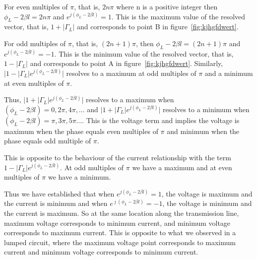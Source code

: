 For even multiples of $\pi$, that is, $2n\pi$ where n is a positive integer then $\phi_L - 2\beta l = 2n\pi$ and $ e^{j(\phi_L - 2 \beta l)} = 1$. This is the maximum value of the resolved vector, that is, $1 + \lvert\Gamma_L\rvert$ and corresponds to point B in figure~\ref{fig:kjhgfdwert}.

For odd multiples of $\pi$, that is, $(2n + 1)\pi$, then $\phi_L - 2 \beta l=(2 n + 1)\pi$ and $e^{j (\phi_L - 2 \beta l)} = -1$. This is the minimum value of the resolved vector, that is, $1 - \lvert\Gamma_L\rvert$ and corresponds to point A in figure~\ref{fig:kjhgfdwert}. Similarly, $\lvert 1 - \lvert\Gamma_L\rvert e^{j (\phi_L - 2\beta l)}\rvert$ resolves to a maximum at odd multiples of $\pi$ and a minimum at even multiples of $\pi$.

Thus, $\lvert 1 + \lvert\Gamma_L\rvert e^{j (\phi_L - 2\beta l)}\rvert$ resolves to a maximum when $(\phi_L - 2\beta l) = 0, 2\pi, 4\pi, \ldots$ and $\lvert 1 + \lvert\Gamma_L\rvert e^{j (\phi_L - 2\beta l)}\rvert$ resolves to a minimum when $(\phi_L -2\beta l) = \pi, 3\pi, 5\pi \ldots$. This is the voltage term and implies the voltage is maximum when the phase equals even multiples of $\pi$ and minimum when the phase equals odd multiple of $\pi$.

This is opposite to the behaviour of the current relationship with the term $1-|\Gamma_L| e^{j(\phi_L -2\beta l)}$. At odd multiples of $\pi$ we have a maximum and at even multiples of $\pi$ we have a minimum.

Thus we have established that when $ e^{j(\phi_L - 2 \beta l)} = 1$, the voltage is maximum and the current is minimum and when $ e^{\jmath(\phi_L - 2 \beta l)} = -1$, the voltage is minimum and the current is maximum. So at the same location along the transmission line, maximum voltage corresponds to minimum current, and minimum voltage corresponds to maximum current. This is opposite to what we observed in a lumped circuit, where the maximum voltage point corresponds to maximum current and minimum voltage corresponds to minimum current.


